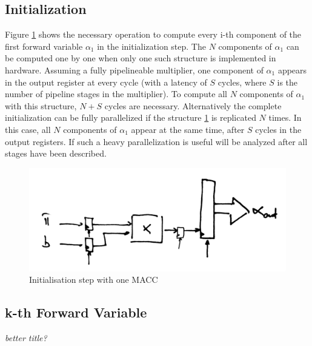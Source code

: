 \documentclass[mscthesis]{usiinfthesis}
\begin{document}
\subsection{Initialization}

Figure \ref{fig:init_s} shows the necessary operation to compute every i-th
component of the first forward variable $ \alpha_1 $ in the initialization
step.  The $ N $ components of $ \alpha_1 $ can be computed one by one when
only one such structure is implemented in hardware. Assuming a fully
pipelineable multiplier, one component of $ \alpha_1 $ appears in the output
register at every cycle (with a latency of $ S $ cycles, where $ S $ is the
number of pipeline stages in the multiplier). To compute all $ N $ components
of $ \alpha_1 $ with this structure, $ N + S $ cycles are necessary.
Alternatively the complete initialization can be fully parallelized if the
structure \ref{fig:init_s} is replicated $ N $ times. In this case, all
$ N $ components of $ \alpha_1 $ appear at the same time, after $ S $ cycles in
the output registers. If such a heavy parallelization is useful will be
analyzed after all stages have been described.


%    
\begin{figure}[h]
    \includegraphics[width=1\columnwidth]{arch_init_s.png}
    \caption{Initialisation step with one MACC}
    \label{fig:init_s}
\end{figure}

\subsection{k-th Forward Variable}
\emph{\color{red}better title?}
\end{document}

